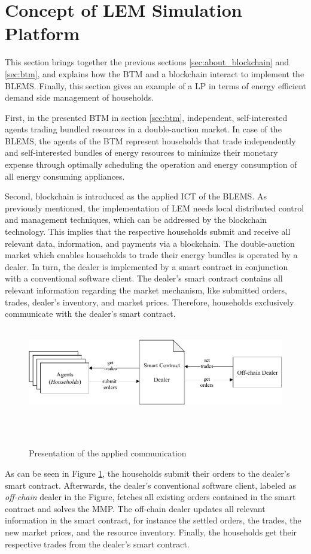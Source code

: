 \section{Concept of LEM Simulation Platform}
\label{sec:concept_of_lem}
This section brings together the previous sections \ref{sec:about_blockchain} and \ref{sec:btm},
and explains how the BTM and a blockchain interact to implement the BLEMS.
Finally, this section gives an example of a LP in terms of energy efficient demand side management of households. 

First, in the presented BTM in section \ref{sec:btm}, independent, self-interested agents trading bundled resources
in a double-auction market. 
In case of the BLEMS, the agents of the BTM represent households that 
trade independently and self-interested bundles of energy resources to minimize their monetary expense 
through optimally scheduling the operation and energy consumption 
of all energy consuming appliances.

Second, blockchain is introduced as the applied ICT of the BLEMS. 
As previously mentioned, the implementation of LEM needs local distributed control and 
management techniques, which can be addressed by the blockchain technology.
This implies that the respective households submit and receive all relevant data, information, and payments via a blockchain. 
The double-auction market which enables households to trade their energy bundles is operated by a dealer.
In turn, the dealer is implemented by a smart contract in conjunction with a conventional software client. 
The dealer's smart contract contains all relevant information regarding the market mechanism, like submitted orders, trades, 
dealer's inventory, and market prices. 
Therefore, households exclusively communicate with the dealer's smart contract. 

\begin{figure}[htbp]
    \centering
    \includegraphics[width=.85\linewidth]{./figures/concept_lem.pdf}
    \caption{Presentation of the applied communication}
    \label{figure:concept_lem}
\end{figure}

As can be seen in Figure \ref{figure:concept_lem}, the households submit their orders to the dealer's smart contract. 
Afterwards, the dealer's conventional software client, labeled as \textit{off-chain} dealer in the Figure, fetches all existing orders contained in the smart contract
and solves the MMP.
The off-chain dealer updates all relevant information in the smart contract, for instance 
the settled orders, the trades, the new market prices, and the resource inventory.
Finally, the households get their respective trades from the dealer's smart contract. 

